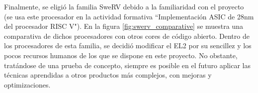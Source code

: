 Finalmente, se eligió la familia SweRV debido a la familiaridad con el proyecto (se usa este procesador en la actividad formativa ``Implementación ASIC de 28nm del procesador RISC V"). En la figura \ref{fig:swerv_comparative} se muestra una comparativa de dichos procesadores con otros cores de código abierto. Dentro de los procesadores de esta familia, se decidió modificar el EL2 por su sencillez y los pocos recursos humanos de los que se dispone en este proyecto. No obstante, tratándose de una prueba de concepto, siempre es posible en el futuro aplicar las técnicas aprendidas a otros productos más complejos, con mejoras y optimizaciones.
